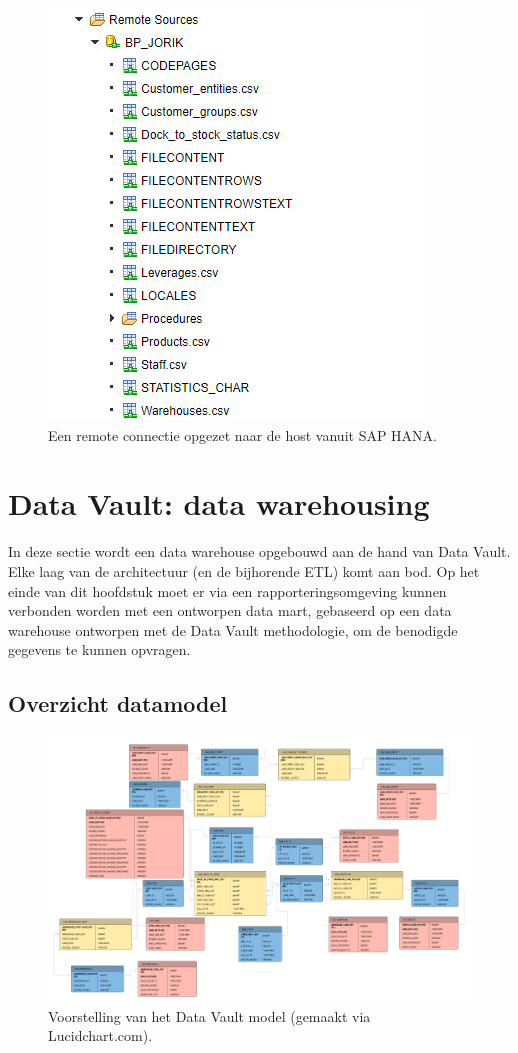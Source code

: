 \begin{figure}[h]
	\centering
	\includegraphics[scale=0.5]{../images/remoteconn.png}
	\caption{Een remote connectie opgezet naar de host vanuit SAP HANA.}
	\label{fig:remoteconn}
\end{figure}

\section{Data Vault: data warehousing}
\label{ch:dvmodel}
In deze sectie wordt een data warehouse opgebouwd aan de hand van Data Vault. Elke laag van de architectuur (en de bijhorende ETL) komt aan bod. Op het einde van dit hoofdstuk moet er via een rapporteringsomgeving kunnen verbonden worden met een ontworpen data mart, gebaseerd op een data warehouse ontworpen met de Data Vault methodologie, om de benodigde gegevens te kunnen opvragen.

\subsection{Overzicht datamodel}
\begin{figure}[h]
	\centering
	\includegraphics[scale=0.34]{../images/DataVaultModel.png}
	\caption{Voorstelling van het Data Vault model (gemaakt via Lucidchart.com).}
	\label{fig:dvm}
\end{figure}

